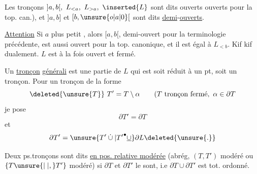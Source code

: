 Les tronçons $]a,b[,\ L_{<a},\ L_{>a},\ \inserted{L}$ sont dits ouverts    ouverts pour la top. can.),  et $]a,b]$ et $[b,\unsure{o|a|0}[$ sont dits \uline{demi}-\uline{ouverts}.

\uline{Attention}  Si $a$ plus petit , alors $[a,b[$,   demi-ouvert pour la terminologie précédente, est aussi ouvert pour la top. canonique, et il est égal à $L_{<b}$. Kif kif dualement. $L$ est à la fois ouvert et fermé.

Un \uline{tronçon} \uline{générali}  est une partie de $L$ qui est soit réduit à un pt, soit un tronçon. Pour un tronçon de la forme
\[
\deleted{\unsure{T}}\ T'=T\setminus\alpha\qquad(T\text{ tronçon fermé},\ \alpha\in\partial T
\]
je pose
\[
\partial T'=\partial T
\]
et  
\[
\partial T'=\unsure{T'\mathbin{\dot\cup}|{T'}^\bullet\mathbin{\underline{\cup}}}\partial L\deleted{\unsure{.}}
\]

 Deux ps.tronçons  sont dits \uline{en pos. relative modérée} (abrég, $(T,T')$  modéré ou $\{T\unsure{\mid|,}T'\}$ modéré) si $\partial T$ et $\partial T'$ le sont, i.e $\partial T\cup\partial T'$ est tot. ordonné.

